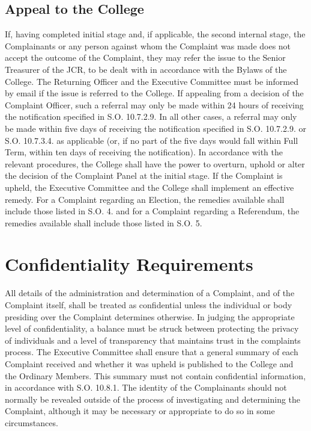 \subsection{Appeal to the College}
\npara If, having completed initial stage and, if applicable, the second internal stage, the Complainants or any person against whom the Complaint was made does not accept the outcome of the Complaint, they may refer the issue to the Senior Treasurer of the JCR, to be dealt with in accordance with the Bylaws of the College.  The Returning Officer and the Executive Committee must be informed by email if the issue is referred to the College.
\npara If appealing from a decision of the Complaint Officer, such a referral may only be made within 24 hours of receiving the notification specified in S.O. 10.7.2.9.  In all other cases, a referral may only be made within five days of receiving the notification specified in S.O. 10.7.2.9. or S.O. 10.7.3.4. as applicable (or, if no part of the five days would fall within Full Term, within ten days of receiving the notification).
\npara In accordance with the relevant procedures, the College shall have the power to overturn, uphold or alter the decision of the Complaint Panel at the initial stage.
\npara If the Complaint is upheld, the Executive Committee and the College shall implement an effective remedy.  For a Complaint regarding an Election, the remedies available shall include those listed in S.O. 4. and for a Complaint regarding a Referendum, the remedies available shall include those listed in S.O. 5.
\section{Confidentiality Requirements}
\npara All details of the administration and determination of a Complaint, and of the Complaint itself, shall be treated as confidential unless the individual or body presiding over the Complaint determines otherwise.
\npara In judging the appropriate level of confidentiality, a balance must be struck between protecting the privacy of individuals and a level of transparency that maintains trust in the complaints process.
\npara The Executive Committee shall ensure that a general summary of each Complaint received and whether it was upheld is published to the College and the Ordinary Members.  This summary must not contain confidential information, in accordance with S.O. 10.8.1.
\npara The identity of the Complainants should not normally be revealed outside of the process of investigating and determining the Complaint, although it may be necessary or appropriate to do so in some circumstances.





